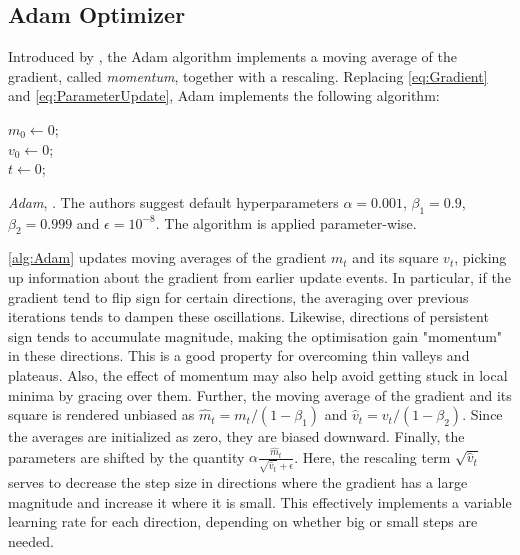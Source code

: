 \subsection{Adam Optimizer}\label{sec:AdamOptimizer}
Introduced by \citet{kingma2017adam}, the Adam algorithm implements a moving average of the gradient, called \emph{momentum}, together with a rescaling. Replacing \autoref{eq:Gradient} and \autoref{eq:ParameterUpdate}, Adam implements the following algorithm:

\begin{algorithm}[H]\label{alg:Adam}
\SetAlgoLined

$m_0 \gets 0$;\\
$v_0 \gets 0$;\\
$t \gets 0$;\\
\caption{\emph{Adam}, \cite{kingma2017adam}. The authors suggest default hyperparameters $\alpha = 0.001$, $\beta_1 = 0.9$, $\beta_2 = 0.999$ and $\epsilon = 10^{-8}$. The algorithm is applied parameter-wise.}
\end{algorithm}

\autoref{alg:Adam} updates moving averages of the gradient $m_t$ and its square $v_t$, picking up information about the gradient from earlier update events. In particular, if the gradient tend to flip sign for certain directions, the averaging over previous iterations tends to dampen these oscillations. Likewise, directions of persistent sign tends to accumulate magnitude, making the optimisation gain "momentum" in these directions. This is a good property for overcoming thin valleys and plateaus. Also, the effect of momentum may also help avoid getting stuck in local minima by gracing over them. Further, the moving average of the gradient and its square is rendered unbiased as $\hat{m}_t = m_t/(1-\beta_1)$ and $\hat{v}_t = v_t/(1-\beta_2)$. Since the averages are initialized as zero, they are biased downward. Finally, the parameters are shifted by the quantity $\alpha \frac{\hat{m}_t}{\sqrt{\hat{v}_t} + \epsilon}$. Here, the rescaling term $\sqrt{\hat{v}_t}$ serves to decrease the step size in directions where the gradient has a large magnitude and increase it where it is small. This effectively implements a variable learning rate for each direction, depending on whether big or small steps are needed. 

